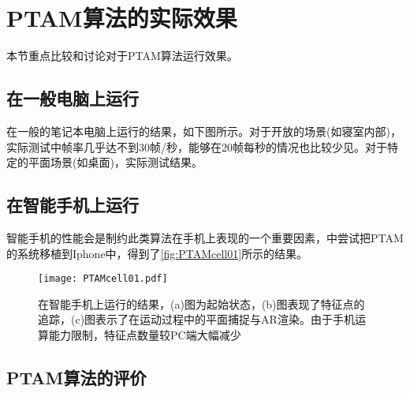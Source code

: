 \section{PTAM算法的实际效果}

本节重点比较和讨论对于PTAM算法运行效果。

\subsection{在一般电脑上运行}

在一般的笔记本电脑上运行的结果，如下图所示。对于开放的场景(如寝室内部)，实际测试中帧率几乎达不到30帧/秒，能够在20帧每秒的情况也比较少见。对于特定的平面场景(如桌面)，实际测试结果。

\subsection{在智能手机上运行}

智能手机的性能会是制约此类算法在手机上表现的一个重要因素，\cite{Klein2009}中尝试把PTAM的系统移植到Iphone中，得到了\autoref{fig:PTAMcell01}所示的结果。

\begin{figure}[!htbp]
\centering
\texttt{[image: PTAMcell01.pdf]}
\caption{在智能手机上运行的结果，(a)图为起始状态，(b)图表现了特征点的追踪，(c)图表示了在运动过程中的平面捕捉与AR渲染。由于手机运算能力限制，特征点数量较PC端大幅减少}
\label{fig:PTAMcell01}
\end{figure}


\subsection{PTAM算法的评价}
